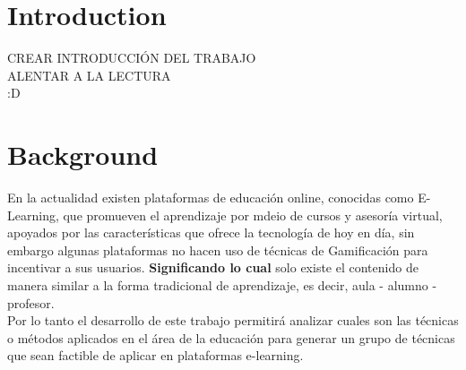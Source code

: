 \documentclass[•]{article}
\begin{document}
\flushbottom %

\maketitle %

\tableofcontents %

\thispagestyle{empty} %



\section*{Introduction} %

CREAR INTRODUCCIÓN DEL TRABAJO \\
ALENTAR A LA LECTURA\\
:D\\



\section{Background}
En la actualidad existen plataformas de educación online, conocidas como E-Learning, que promueven el aprendizaje por mdeio de cursos y asesoría virtual, apoyados por las características que ofrece la tecnología de hoy en día, sin embargo algunas plataformas no hacen uso de técnicas de Gamificación para incentivar a sus usuarios. \textbf{Significando lo cual} solo existe el contenido de manera similar a la forma tradicional de aprendizaje, es decir, aula - alumno - profesor. \\
Por lo tanto el desarrollo de este trabajo permitirá analizar cuales son las técnicas o métodos aplicados en el área de la educación para generar un grupo de técnicas que sean factible de aplicar en plataformas e-learning.\\  \\
\end{document}
